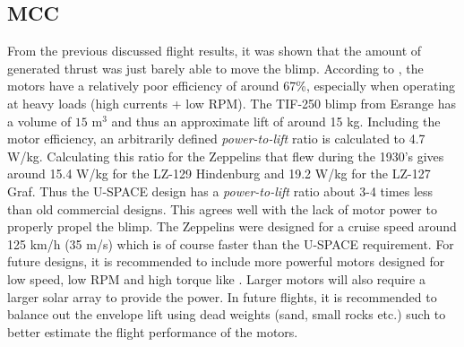 %
\subsection{MCC}
From the previous discussed flight results, it was shown that the amount of generated thrust was just barely able to move the blimp. According to \cite{website:ModelMotors}, the motors have a relatively poor efficiency of around 67\%, especially when operating at heavy loads (high currents + low \ac{RPM}). The TIF-250 blimp from Esrange has a volume of $15$ m$^3$ and thus an approximate lift of around 15 kg. Including the motor efficiency, an arbitrarily defined \textit{power-to-lift} ratio is calculated to 4.7 W/kg. Calculating this ratio for the Zeppelins that flew during the 1930's\cite{website:graf_zeppelin} gives around 15.4 W/kg for the LZ-129 Hindenburg and 19.2 W/kg for the LZ-127 Graf. Thus the U-SPACE design has a \textit{power-to-lift} ratio about 3-4 times less than old commercial designs. This agrees well with the lack of motor power to properly propel the blimp. The Zeppelins were designed for a cruise speed around 125 km/h (35 m/s) which is of course faster than the U-SPACE requirement. For future designs, it is recommended to include more powerful motors designed for low speed, low \ac{RPM} and high torque like \cite{website:ModelMotors_AXI5360}. Larger motors will also require a larger solar array to provide the power.
In future flights, it is recommended to balance out the envelope lift using dead weights (sand, small rocks etc.) such to better estimate the flight performance of the motors.

